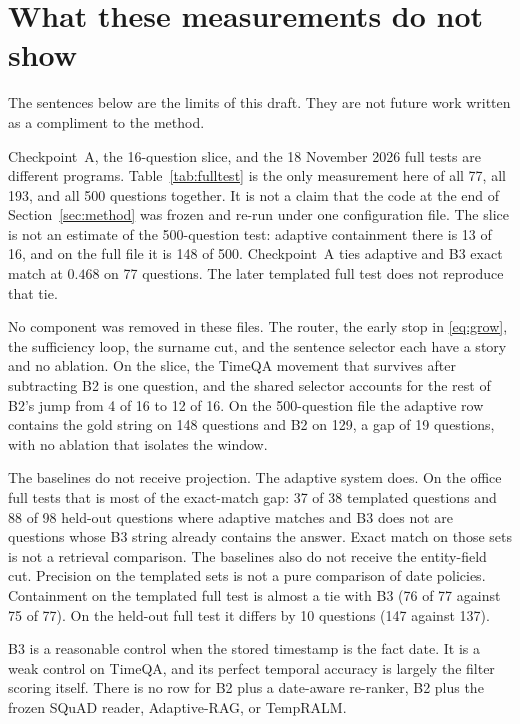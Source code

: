 \documentclass[11pt,letterpaper]{article}
\begin{document}
\section{What these measurements do not show}
\label{sec:limits}

The sentences below are the limits of this draft.
They are not future work written as a compliment to the method.

Checkpoint~A, the 16-question slice, and the 18 November 2026 full tests are different programs.
Table~\ref{tab:fulltest} is the only measurement here of all 77, all 193, and all 500 questions together.
It is not a claim that the code at the end of Section~\ref{sec:method} was frozen and re-run under one configuration file.
The slice is not an estimate of the 500-question test: adaptive containment there is 13 of 16, and on the full file it is 148 of 500.
Checkpoint~A ties adaptive and B3 exact match at $0.468$ on 77 questions.
The later templated full test does not reproduce that tie.

No component was removed in these files.
The router, the early stop in \eqref{eq:grow}, the sufficiency loop, the surname cut, and the sentence selector each have a story and no ablation.
On the slice, the TimeQA movement that survives after subtracting B2 is one question, and the shared selector accounts for the rest of B2's jump from 4 of 16 to 12 of 16.
On the 500-question file the adaptive row contains the gold string on 148 questions and B2 on 129, a gap of 19 questions, with no ablation that isolates the window.

The baselines do not receive projection.
The adaptive system does.
On the office full tests that is most of the exact-match gap: 37 of 38 templated questions and 88 of 98 held-out questions where adaptive matches and B3 does not are questions whose B3 string already contains the answer.
Exact match on those sets is not a retrieval comparison.
The baselines also do not receive the entity-field cut.
Precision on the templated sets is not a pure comparison of date policies.
Containment on the templated full test is almost a tie with B3 (76 of 77 against 75 of 77).
On the held-out full test it differs by 10 questions (147 against 137).

B3 is a reasonable control when the stored timestamp is the fact date.
It is a weak control on TimeQA, and its perfect temporal accuracy is largely the filter scoring itself.
There is no row for B2 plus a date-aware re-ranker, B2 plus the frozen SQuAD reader, Adaptive-RAG, or TempRALM.
\end{document}
